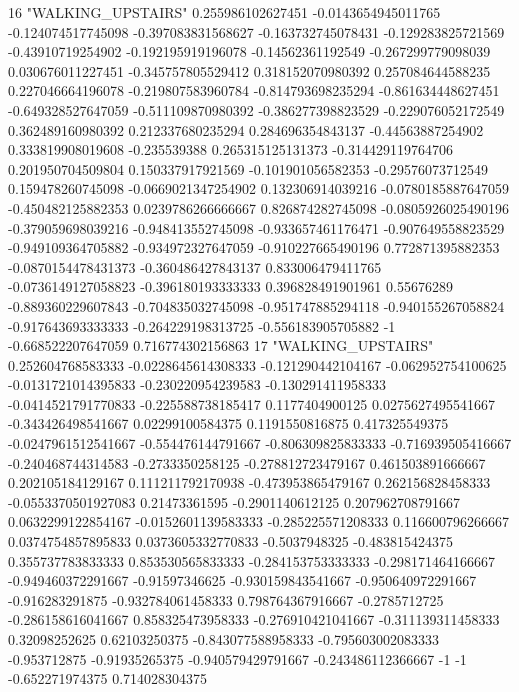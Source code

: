 16 "WALKING_UPSTAIRS" 0.255986102627451 -0.0143654945011765 -0.124074517745098 -0.397083831568627 -0.163732745078431 -0.129283825721569 -0.43910719254902 -0.192195919196078 -0.14562361192549 -0.267299779098039 0.030676011227451 -0.345757805529412 0.318152070980392 0.257084644588235 0.227046664196078 -0.219807583960784 -0.814793698235294 -0.861634448627451 -0.649328527647059 -0.511109870980392 -0.386277398823529 -0.229076052172549 0.362489160980392 0.212337680235294 0.284696354843137 -0.44563887254902 0.333819908019608 -0.235539388 0.265315125131373 -0.314429119764706 0.201950704509804 0.150337917921569 -0.101901056582353 -0.29576073712549 0.159478260745098 -0.0669021347254902 0.132306914039216 -0.0780185887647059 -0.450482125882353 0.0239786266666667 0.826874282745098 -0.0805926025490196 -0.379059698039216 -0.948413552745098 -0.933657461176471 -0.907649558823529 -0.949109364705882 -0.934972327647059 -0.910227665490196 0.772871395882353 -0.0870154478431373 -0.360486427843137 0.833006479411765 -0.0736149127058823 -0.396180193333333 0.396828491901961 0.55676289 -0.889360229607843 -0.704835032745098 -0.951747885294118 -0.940155267058824 -0.917643693333333 -0.264229198313725 -0.556183905705882 -1 -0.668522207647059 0.716774302156863
17 "WALKING_UPSTAIRS" 0.252604768583333 -0.0228645614308333 -0.121290442104167 -0.062952754100625 -0.0131721014395833 -0.230220954239583 -0.130291411958333 -0.0414521791770833 -0.225588738185417 0.1177404900125 0.0275627495541667 -0.343426498541667 0.02299100584375 0.1191550816875 0.417325549375 -0.0247961512541667 -0.554476144791667 -0.806309825833333 -0.716939505416667 -0.240468744314583 -0.2733350258125 -0.278812723479167 0.461503891666667 0.202105184129167 0.111211792170938 -0.473953865479167 0.262156828458333 -0.0553370501927083 0.21473361595 -0.2901140612125 0.207962708791667 0.0632299122854167 -0.0152601139583333 -0.285225571208333 0.116600796266667 0.0374754857895833 0.0373605332770833 -0.5037948325 -0.483815424375 0.355737783833333 0.853530565833333 -0.284153753333333 -0.298171464166667 -0.949460372291667 -0.91597346625 -0.930159843541667 -0.950640972291667 -0.916283291875 -0.932784061458333 0.798764367916667 -0.2785712725 -0.286158616041667 0.858325473958333 -0.276910421041667 -0.311139311458333 0.32098252625 0.62103250375 -0.843077588958333 -0.795603002083333 -0.953712875 -0.91935265375 -0.940579429791667 -0.243486112366667 -1 -1 -0.652271974375 0.714028304375
